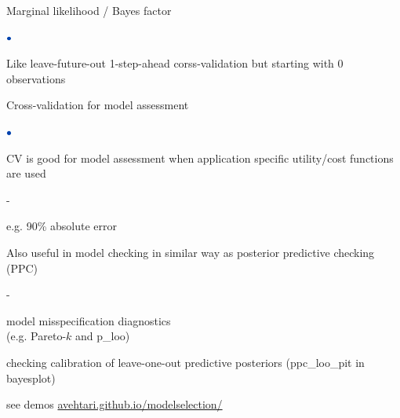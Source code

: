 \documentclass[english,t]{beamer}
\newenvironment{list1}{
   \begin{list}{$\color{list1}\bullet$}{\itemsep=6pt}}{
  \end{list}}
\newenvironment{list2}{
  \begin{list}{-}{\baselineskip=12pt\itemsep=2pt}}{
  \end{list}}
\begin{document}
\begin{frame}{}

{\Large\color{navyblue} Marginal likelihood / Bayes factor}

\vspace{-0.3\baselineskip}
\begin{list1}
\item Like leave-future-out 1-step-ahead corss-validation but starting with 0 observations\\
\end{list1}
\vspace{-0.5\baselineskip}

\end{frame}

\begin{frame}{}

{\Large\color{navyblue} Cross-validation for model assessment}

\begin{list1}
\item CV is good for model assessment when application specific utility/cost functions are used
  \begin{list2}
  \item e.g. 90\% absolute error
  \end{list2}
\item<2-> Also useful in model checking in similar way as posterior
  predictive checking (PPC)
  \begin{list2}
  \item model misspecification diagnostics\\ (e.g. Pareto-$k$ and p\_loo)
  \item checking calibration of leave-one-out predictive posteriors
    (ppc\_loo\_pit in bayesplot)
  \end{list2}
  {\small see demos \url{avehtari.github.io/modelselection/}}
\end{list1}

\end{frame}
\end{document}
